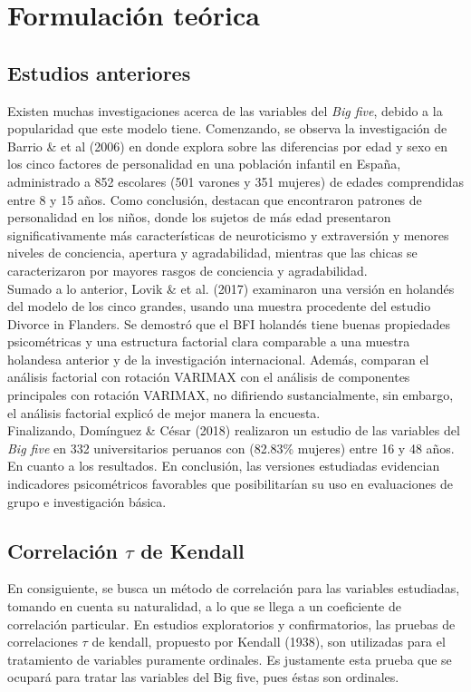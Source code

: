 \documentclass{report}
\begin{document}
\chapter{Formulación teórica}
\section{Estudios anteriores}
Existen muchas investigaciones acerca de las variables del \textit{Big five}, debido a la popularidad que este modelo tiene. Comenzando, se observa la investigación de Barrio \& et al (2006) en donde explora sobre las diferencias por edad y sexo en los cinco factores de personalidad en una población infantil en España, administrado a 852 escolares (501 varones y 351 mujeres) de edades comprendidas entre 8 y 15 años. Como conclusión, destacan que encontraron patrones de personalidad en los niños, donde los sujetos de más edad presentaron significativamente más características de neuroticismo y extraversión y menores niveles de conciencia, apertura y agradabilidad, mientras que las chicas se caracterizaron por mayores rasgos de conciencia y agradabilidad.\\

Sumado a lo anterior, Lovik \& et al. (2017) 
examinaron una versión en holandés del modelo de los cinco grandes, usando una muestra procedente del estudio Divorce in Flanders. Se demostró que el BFI holandés tiene buenas propiedades psicométricas y una estructura factorial clara comparable a una muestra holandesa anterior y de la investigación internacional. Además, comparan el análisis factorial con rotación VARIMAX con el análisis de componentes principales con rotación VARIMAX, no difiriendo sustancialmente, sin embargo, el análisis factorial explicó de mejor manera la encuesta.\\

Finalizando, Domínguez \& César (2018) realizaron un estudio de las variables del \textit{Big five} en 332 universitarios peruanos con (82.83\% mujeres) entre 16 y 48 años. En cuanto a los resultados. En conclusión, las versiones estudiadas evidencian indicadores psicométricos favorables que posibilitarían su uso en evaluaciones de grupo e investigación básica.


\newpage
\section{Correlación $\tau$ de Kendall}
En consiguiente, se busca un método de correlación para las variables estudiadas, tomando en cuenta su naturalidad, a lo que se llega a un coeficiente de correlación particular. En estudios exploratorios y confirmatorios, las pruebas de correlaciones $\tau$ de kendall, propuesto por Kendall (1938), son utilizadas para el tratamiento de variables puramente ordinales. Es justamente esta prueba que se ocupará para tratar las variables del Big five, pues éstas son ordinales.\\
\end{document}
